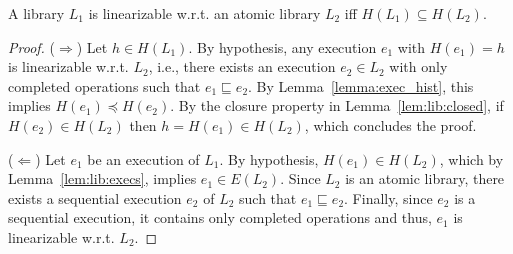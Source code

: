 


\begin{proposition}

A library $L_1$ is linearizable w.r.t. an atomic library $L_2$ iff $H(L_1)\subseteq H(L_2)$.

\end{proposition}

\begin{proof}

($\Rightarrow$) Let $h\in H(L_1)$. By hypothesis, any execution $e_1$ with $H(e_1)=h$ is linearizable w.r.t. $L_2$, i.e.,
there exists an execution $e_2\in L_2$ with only completed operations 
such that $e_1\sqsubseteq e_2$. By Lemma~\ref{lemma:exec_hist}, this implies $H(e_1)\preceq H(e_2)$.
By the closure property in Lemma~\ref{lem:lib:closed}, if $H(e_2)\in H(L_2)$
then $h=H(e_1)\in H(L_2)$, which concludes the proof.

($\Leftarrow$) Let $e_1$ be an execution of $L_1$. By hypothesis, $H(e_1)\in H(L_2)$, which by Lemma~\ref{lem:lib:execs},
implies $e_1\in E(L_2)$.
Since $L_2$ is an atomic library, %
there exists a sequential execution $e_2$ of $L_2$ such that $e_1\sqsubseteq e_2$. Finally, since $e_2$ is a sequential execution,
it contains only completed operations and thus, $e_1$ is linearizable w.r.t. $L_2$.
%
\end{proof}


